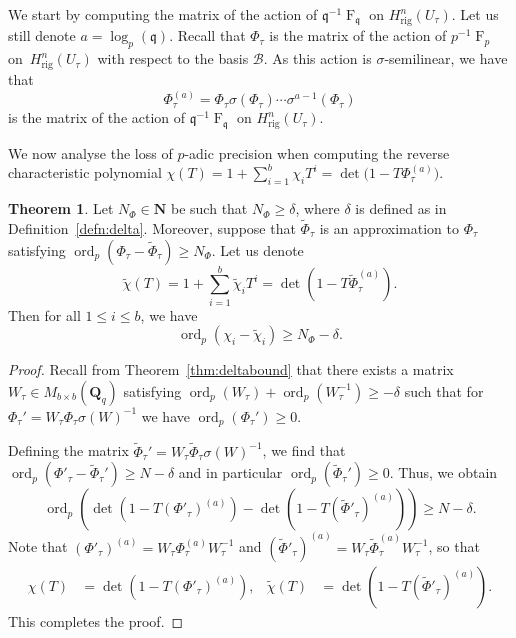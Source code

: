 \documentclass[a4paper,11pt]{article}
\numberwithin{equation}{section}
\newcommand{\NN}{\mathbf{N}} %
\newcommand{\QQ}{\mathbf{Q}} %
\DeclareMathOperator{\ord}{ord}          %
\DeclareMathOperator{\Frob}{F}           %
\providecommand{\Hrig}{H_{\text{rig}}}  %
\providecommand{\cB}{\mathcal{B}} %
\theoremstyle{definition}
\newtheorem{thm}{Theorem}[section]
\begin{document}
We start by computing the matrix of the action 
of $\mathfrak{q}^{-1} \Frob_{\mathfrak{q}}$ on $\Hrig^n(U_{\tau})$. 
Let us still denote $a=\log_p(\mathfrak{q})$. Recall that $\Phi_{\tau}$ 
is the matrix of the action of $p^{-1} \Frob_p$ on~$\Hrig^{n}(U_{\tau})$ 
with respect to the basis $\cB$. As this action is $\sigma$-semilinear, 
we have that 
\begin{equation*}
\Phi_{\tau}^{(a)} = 
    \Phi_{\tau} \sigma(\Phi_{\tau}) \dotsm \sigma^{a-1}(\Phi_{\tau})
\end{equation*}
is the matrix of the action of $\mathfrak{q}^{-1} \Frob_{\mathfrak{q}}$ 
on $\Hrig^n(U_{\tau})$. 

We now analyse the loss of $p$-adic precision when computing 
the reverse characteristic polynomial 
$\chi(T)=1+\sum_{i=1}^b \chi_i T^i=\det\bigl( 1 - T \Phi_{\tau}^{(a)}\bigr)$.

\begin{thm} \label{thm:preccharpoly}
Let $N_{\Phi} \in \NN$ be such that $N_{\Phi} \geq \delta$, 
where $\delta$ is defined as in Definition~\ref{defn:delta}.
Moreover, suppose that $\tilde{\Phi}_{\tau}$ is an approximation to $\Phi_{\tau}$ satisfying
$\ord_p (\Phi_{\tau}-\tilde{\Phi}_{\tau}) \geq N_{\Phi}$.
Let us denote
\[
\tilde{\chi}(T) = 1 + \sum_{i=1}^b \tilde{\chi}_i T^i 
                = \det\left( 1 - T \tilde{\Phi}_{\tau}^{(a)}\right).
\]
Then for all $1 \leq i \leq b$, we have
\[
\ord_p \left(\chi_i - \tilde{\chi}_i \right) \geq N_{\Phi}-\delta.
\]
\end{thm}

\begin{proof} 
Recall from Theorem~\ref{thm:deltabound} that there exists a matrix 
$W_{\tau} \in M_{b \times b}(\QQ_q)$ satisfying 
$\ord_p(W_{\tau})+\ord_p(W_{\tau}^{-1}) \geq -\delta$ such that for 
$\Phi_{\tau}'=W_{\tau} \Phi_{\tau} \sigma(W)^{-1}$ 
we have \mbox{$\ord_p(\Phi_{\tau}') \geq 0$}.

Defining the matrix 
$\tilde{\Phi}_{\tau}'=W_{\tau} \tilde{\Phi}_{\tau} \sigma(W)^{-1}$, we find that 
$\ord_p(\Phi'_{\tau}-\tilde{\Phi}_{\tau}') \geq N-\delta$ and in particular
$\ord_p(\tilde{\Phi}_{\tau}') \geq 0$. Thus, we obtain
\[
\ord_p \left( \det\left(1 - T (\Phi'_{\tau})^{(a)}\right) 
            - \det\left(1 - T (\tilde{\Phi}'_{\tau})^{(a)}\right) \right) \geq N-\delta.
\] 
Note that $(\Phi'_{\tau})^{(a)}= W_{\tau} \Phi_{\tau}^{(a)} W_{\tau}^{-1}$
and $(\tilde{\Phi}'_{\tau})^{(a)}= W_{\tau} \tilde{\Phi}_{\tau}^{(a)} W_{\tau}^{-1}$, 
so that
\begin{align*}
\chi(T) &= \det\left(1 - T (\Phi'_{\tau})^{(a)}\right),
&\tilde{\chi}(T) &= \det\left(1 - T (\tilde{\Phi}'_{\tau})^{(a)}\right).
\end{align*}
This completes the proof.
\end{proof}
\end{document}
